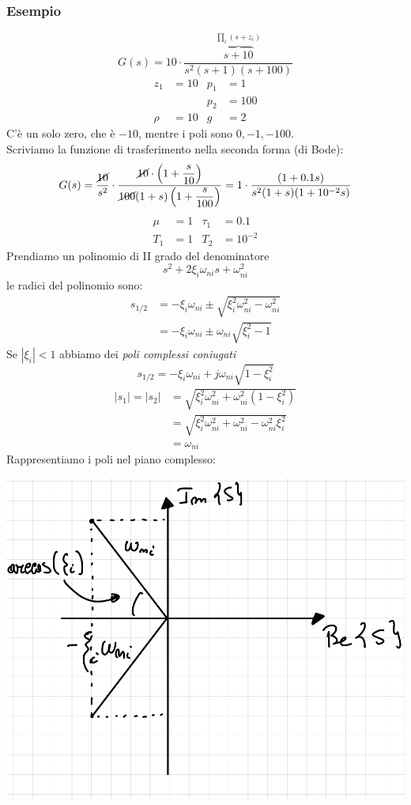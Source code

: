 \documentclass{article}
\numberwithin{equation}{subsection}
\begin{document}
\subsubsection{Esempio}
\[
    G(s) = 10 \cdot \frac{\overbrace{s+10}^{\prod_i(s+z_i)}}{s^2(s+1)(s+100)}
\]
\begin{align*}
    z_1 &= 10 & p_1 &= 1 \\
    & & p_2 &= 100\\
    \rho &= 10 & g &= 2
\end{align*}
C'è un solo zero, che è $-10$, mentre i poli sono $0,-1,-100$.
\vspace*{0.2cm}\\
Scriviamo la funzione di trasferimento nella seconda forma (di Bode):
\[
    G(s) = \frac{\cancel{10}}{s^2} \cdot \frac{\cancel{10} \cdot \left(1 + \dfrac{s}{10}\right)}{\cancel{100}(1+s)\left(1 + \dfrac{s}{100}\right)} = 1\cdot \frac{(1 + 0.1 s)}{s^2(1+s)(1+10^{-2}s)}
\]
\begin{align*}
    \mu &= 1 & \tau_1 &= 0.1\\
    T_1 &= 1 & T_2 &= 10^{-2}
\end{align*}
Prendiamo un polinomio di II grado del denominatore
\[
    s^2 + 2 \xi_i \omega_{ni}s + \omega^2_{ni}
\]
le radici del polinomio sono:
\begin{align*}
    s_{1/2} &= - \xi_i\omega_{ni} \pm \sqrt{\xi_i^2\omega_{ni}^2 - \omega_{ni}^2}\\
    &=- \xi_i \omega_{ni} \pm \omega_{ni} \sqrt{\xi_i^2 - 1}
\end{align*}
Se $|\xi_i|<1$ abbiamo dei \textit{poli complessi coniugati}
\[
    s_{1/2} = - \xi_i \omega_{ni} + j \omega_{ni} \sqrt{1 - \xi_i^2}
\]
\begin{align*}
    |s_1| = |s_2| &= \sqrt{\xi_i^2 \omega_{ni}^2 + \omega_{ni}^2 (1 - \xi_i^2)}\\
    &= \sqrt{\xi_i^2 \omega_{ni}^2 + \omega_{ni}^2  - \omega_{ni}^2\xi_i^2}\\
    &= \omega_{ni}
\end{align*}
Rappresentiamo i poli nel piano complesso:
\begin{center}
    \includegraphics[scale=0.23]{Images/Poli_piano.png}
\end{center}
\end{document}
